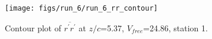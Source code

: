 \begin{figure}[H]
\centering
\texttt{[image: figs/run\_6/run\_6\_rr\_contour]}
\caption{Contour plot of $\overline{r^\prime r^\prime}$ at $z/c$=5.37, $V_{free}$=24.86, station 1.}
\label{fig:run_6_rr_contour}
\end{figure}


